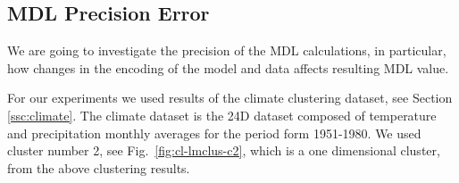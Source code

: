 \subsection{MDL Precision Error}
\label{ssc:mdl-error}


We are going to investigate the precision of the MDL calculations, in particular,
how changes in the encoding of the model and data affects resulting MDL value.




For our experiments we used results of the climate clustering dataset,
see Section \ref{ssc:climate}. The climate dataset is the 24D dataset composed
of temperature and precipitation monthly averages for the period form 1951-1980.
We used cluster number 2, see Fig.~\ref{fig:cl-lmclus-c2}, which is a one
dimensional cluster, from the above clustering results.

